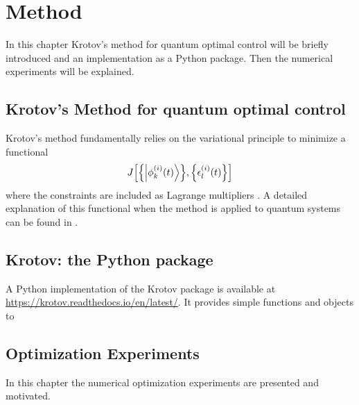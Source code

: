 \documentclass[main.tex]{subfiles}
\begin{document}
\chapter{Method}
In this chapter Krotov's method for quantum optimal control will be briefly introduced and an implementation as a Python package.
Then the numerical experiments will be explained.

\section{Krotov's Method for quantum optimal control}
Krotov's method fundamentally relies on the variational principle to minimize a functional \[ J\qty[\qty{\ket{\phi^{(i)}_k(t)}},\qty{\epsilon_l^{(i)}(t)}] \] where the constraints are included as Lagrange multipliers \cite{goerz_krotov:_2019}.
A detailed explanation of this functional when the method is applied to quantum systems can be found in \autocite{reich_monotonically_2012}. 

\section{Krotov: the Python package}
A Python implementation of the Krotov package is available at \url{https://krotov.readthedocs.io/en/latest/}. It provides simple functions and objects to


\section{Optimization Experiments}
In this chapter the numerical optimization experiments are presented and motivated.
\end{document}
